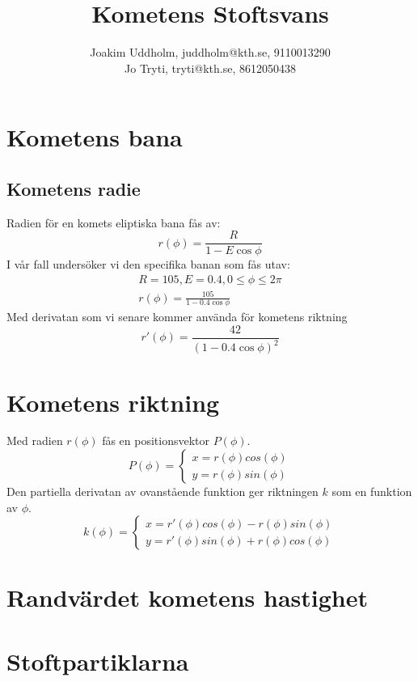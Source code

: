 \documentclass[11pt,twoside]{article}
\title{Kometens Stoftsvans}
\author{Joakim Uddholm, juddholm@kth.se, 9110013290 \\
		Jo Tryti, tryti@kth.se, 8612050438}
\date{}
\begin{document}
\maketitle
\newpage


\section{Kometens bana}

\subsection{Kometens radie}
Radien för en komets eliptiska bana fås av:
\begin{equation}
    r(\phi)=\frac{R}{1-E\cos\phi}
\end{equation}
I vår fall undersöker vi den specifika banan som fås utav:
\begin{equation}
	\begin{split}
     R = 105, E = 0.4, 0 \leq \phi \leq 2\pi \\
     r(\phi)=\frac{105}{1-0.4\cos\phi}
     \end{split}
\end{equation}
Med derivatan som vi senare kommer använda för kometens riktning
\begin{equation}
    r'(\phi)=\frac{42}{(1-0.4\cos\phi)^2}
\end{equation}

\section{Kometens riktning}	
Med radien $r(\phi)$ fås en positionsvektor $P(\phi)$.
\begin{equation}
	P(\phi) = \begin{cases}
	x = r(\phi) cos(\phi) \\
	y = r(\phi) sin(\phi)
	\end{cases}
\end{equation}
Den partiella derivatan av ovanstående funktion ger riktningen $k$ som en funktion av $\phi$. 
\begin{equation}
	k(\phi) = \begin{cases}
	x = r'(\phi) cos(\phi) - r(\phi) sin(\phi) \\
	y = r'(\phi) sin(\phi) + r(\phi) cos(\phi)
	\end{cases}
\end{equation}

\section{Randvärdet kometens hastighet}



\section{Stoftpartiklarna}
\end{document}

